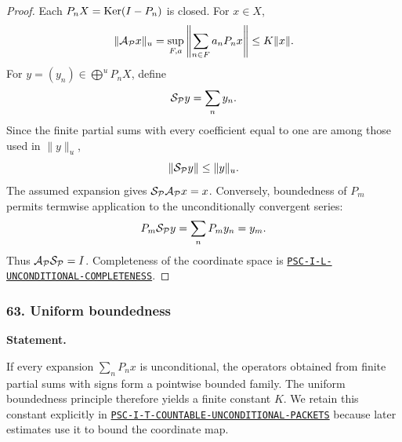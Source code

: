 \begin{proof}
Each $P_nX=\operatorname{Ker}(I-P_n)$ is closed.  For $x\in X$,
\[
\|\mathcal A_{\mathcal P}x\|_u
=
\sup_{F,a}
\left\|\sum_{n\in F}a_nP_nx\right\|
\leq K\|x\|.
\]
For $y=(y_n)\in\bigoplus^uP_nX$, define
\[
\mathcal S_{\mathcal P}y=\sum_ny_n.
\]
Since the finite partial sums with every coefficient equal to one are among those used in $\|y\|_u$,
\[
\|\mathcal S_{\mathcal P}y\|
\leq\|y\|_u.
\]
The assumed expansion gives $\mathcal S_{\mathcal P}\mathcal A_{\mathcal P}x=x$.  Conversely, boundedness of $P_m$ permits termwise application to the unconditionally convergent series:
\[
P_m\mathcal S_{\mathcal P}y
=
\sum_nP_my_n
=y_m.
\]
Thus $\mathcal A_{\mathcal P}\mathcal S_{\mathcal P}=I$.  Completeness of the coordinate space is \hyperref[rec:PSC-I-L-UNCONDITIONAL-COMPLETENESS]{\nolinkurl{PSC-I-L-UNCONDITIONAL-COMPLETENESS}}.
\end{proof}
\subsubsection*{63. Uniform boundedness}
\label{rec:PSC-I-R-UNIFORM-BOUNDEDNESS}
\textbf{Statement.}\par
If every expansion $\sum_nP_nx$ is unconditional, the operators obtained from finite partial sums with signs form a pointwise bounded family.  The uniform boundedness principle therefore yields a finite constant $K$.  We retain this constant explicitly in \hyperref[rec:PSC-I-T-COUNTABLE-UNCONDITIONAL-PACKETS]{\nolinkurl{PSC-I-T-COUNTABLE-UNCONDITIONAL-PACKETS}} because later estimates use it to bound the coordinate map.
